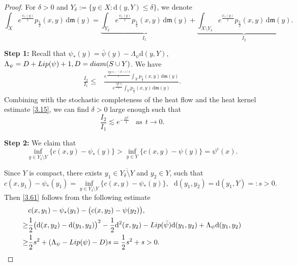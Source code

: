 \documentclass[10pt,a4paper]{amsart}
\newcommand{\Lip}{\mathop{\rm Lip}\nolimits}
\renewcommand{\d}{{\mathrm d}}
\newcommand{\diam}{\mathop{\rm diam}\nolimits}
\newcommand{\mm}{\mathfrak m}
\begin{document}
	\begin{proof}
	For  $\delta>0$ and $Y_\delta:=\{y\in X: \d(y, Y)\leq \delta\}$,  we denote
	\begin{equation}
		\int_X e^{\frac{\psi_{*}(y)}{t}} p_\frac{t}{2}(x,y)\,\d\mm(y)=\underbrace{\int_{Y_\delta} e^{\frac{\psi_{*}(y)}{t}} p_\frac{t}{2}(x,y)\,\d\mm(y)}_{I_1}+\underbrace{\int_{X\setminus Y_\delta} e^{\frac{\psi_{*}(y)}{t}} p_\frac{t}{2}(x,y)\,\d\mm(y)}_{I_2}.
	\end{equation}
	
	{\bf Step 1:} 
Recall that $\psi_{*}(y)=\bar \psi (y)-\Lambda_\psi\d(y,Y)$, $\Lambda_\psi=D+ \Lip(\psi) + 1,  D=\diam(S\cup Y)$.   We have
	\begin{equation}\label{ext}
		\begin{aligned}
			\frac{I_2}{I_1}
			\leq& \frac{e^{\frac{\sup_Y \psi_i-(D+1)\delta}{t}}\int_{X} p_\frac{t}{2}(x,y)\,\d\mm(y)}{e^{\frac{\inf_Y \psi_i}{t}}\int_{Y}  p_\frac{t}{2}(x,y)\,\d\mm(y)}.
		\end{aligned}
	\end{equation}
Combining with the stochastic completeness of the heat flow and the heat kernel estimate \eqref{3.15},    we can find $\delta>0$ large enough such that
 \begin{equation}\label{2.40}
     	\frac{I_2}{I_1}\lesssim  e^{-\frac{D^2}{t}}~~~~\text{as}~~t\to 0.
     \end{equation}
	
	\medskip
	
	{\bf Step 2:} We claim that
	\begin{equation}\label{3.61}
	\inf_{y\in Y_\delta\setminus Y}\{c(x,y)-\psi_{*}(y)\}>\inf_{y\in Y}\{c(x,y)-\psi(y)\}=\psi^c(x).
	\end{equation}
	
	Since $Y$ is compact,  there exists $y_1\in \overline {Y_\delta\setminus Y}$ and $y_2\in Y$,  such that 
	\begin{equation*}
	c(x,y_1)-\psi_{*}(y_1)=\inf_{y\in Y_\delta\setminus Y}\{c(x,y)-\psi_{*}(y)\},~~~\d(y_1,y_2)=\d(y_1,Y)=:s>0.
	\end{equation*}
 Then \eqref{3.61} follows from the following estimate
	\begin{equation}
	\begin{aligned}
	&c(x,y_1)-\psi_{*}(y_1)- \big(c(x,y_2)-\psi(y_2)\big),\\
	\geq & \frac{1}{2}\big(\d(x,y_2)-\d(y_1,y_2)\big)^2-\frac{1}{2}\d^2(x,y_2)-\Lip(\bar \psi)\d(y_1,y_2)+\Lambda_\psi\d(y_1,y_2)\\
	\geq & \frac{1}{2}s^2+(\Lambda_\psi-\Lip(\psi)-D)s=\frac{1}{2}s^2+s>0.
	\end{aligned}
	\end{equation}
	

\end{proof}
\end{document}
